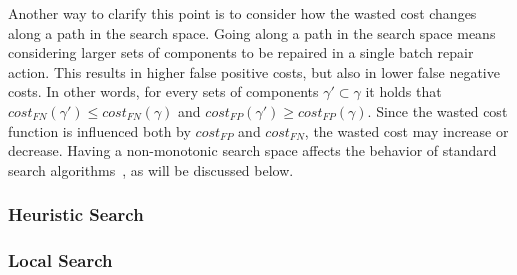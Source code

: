 {Another way to clarify this point is to consider how the wasted cost changes along a path in the search space. 
Going along a path in the search space means considering larger sets of components to be repaired in a single batch repair action. This results in higher false positive costs, but also in lower false negative costs.
In other words, for every sets of components $\gamma' \subset \gamma$
it holds that $cost_{FN}(\gamma')\leq cost_{FN}(\gamma)$ 
and $cost_{FP}(\gamma')\geq cost_{FP}(\gamma)$. Since the wasted cost function is influenced both by $cost_{FP}$ and $cost_{FN}$, the wasted cost may increase or decrease. 
Having a non-monotonic search space affects the behavior of standard search algorithms~\cite{stern2014max}, as will be discussed below. 




























\subsubsection{Heuristic Search} %

\subsubsection*{Local Search}









}

